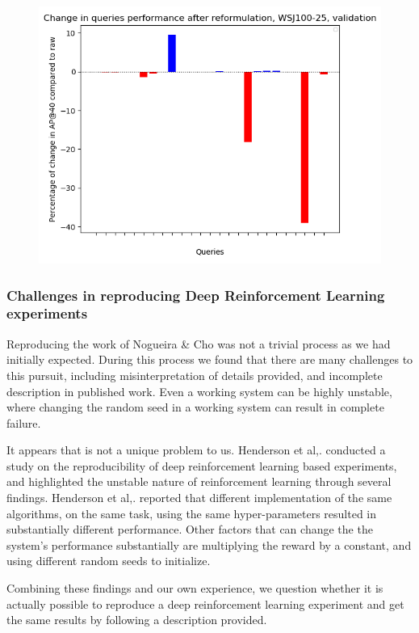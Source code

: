 \begin{figure}[H]
	\centering
	\includegraphics[width=0.7\linewidth]{images/chapter_4/second_system/100-25_valid}
	\caption{}
	\label{fig:100-25valid}
\end{figure}



\subsubsection{Challenges in reproducing Deep Reinforcement Learning experiments}

Reproducing the work of Nogueira \& Cho was not a trivial process as we had initially expected. During this process we found that there are many challenges to this pursuit, including misinterpretation of details provided, and incomplete description in published work. Even a working system can be highly unstable, where changing the random seed in a working system can result in complete failure.

It appears that is not a unique problem to us. Henderson et al,.\cite{henderson2017deep} conducted a study on the reproducibility of deep reinforcement learning based experiments, and highlighted the unstable nature of reinforcement learning through several findings. Henderson et al,. reported that different implementation of the same algorithms, on the same task, using the same hyper-parameters resulted in substantially different performance. Other factors that can change the the system's performance substantially are multiplying the reward by a constant, and using different random seeds to initialize. 

Combining these findings and our own experience, we question whether it is actually possible to reproduce a deep reinforcement learning experiment and get the same results by following a description provided.









